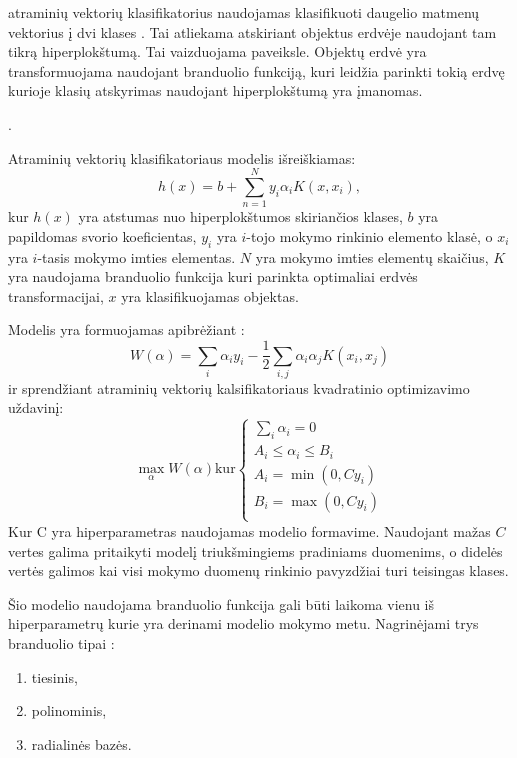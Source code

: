 atraminių vektorių klasifikatorius naudojamas klasifikuoti daugelio matmenų vektorius į dvi klases \cite{comp}. Tai atliekama atskiriant objektus erdvėje naudojant tam tikrą hiperplokštumą. Tai vaizduojama  paveiksle. Objektų erdvė yra transformuojama naudojant branduolio funkciją, kuri leidžia parinkti tokią erdvę kurioje klasių atskyrimas naudojant hiperplokštumą yra įmanomas.

.

Atraminių vektorių klasifikatoriaus modelis išreiškiamas\cite{comp}:
\begin{equation}
    h(x) = b + \sum_{n=1}^{N}y_i \alpha_i K(x, x_i),
\end{equation}
kur $h(x)$ yra atstumas nuo hiperplokštumos skiriančios klases, $b$ yra papildomas svorio koeficientas, $y_i$ yra $i$-tojo mokymo rinkinio elemento klasė, o $x_i$ yra $i$-tasis mokymo imties elementas. $N$ yra mokymo imties elementų skaičius, $K$ yra naudojama branduolio funkcija kuri parinkta optimaliai erdvės transformacijai, $x$ yra klasifikuojamas objektas.

Modelis yra formuojamas apibrėžiant \cite{ksvm}:
\begin{equation}
    W(\alpha) = \sum_{i}\alpha_i y_i - \frac{1}{2} \sum_{i, j} \alpha_i \alpha_j K(x_i, x_j)
\end{equation}
ir sprendžiant atraminių vektorių kalsifikatoriaus kvadratinio optimizavimo uždavinį:
\begin{equation}
\max_{\alpha} W(\alpha) \text{kur} \left\{
                  \begin{array}{l}
                    \sum_{i} \alpha_i = 0 \\
                    A_i \leq \alpha_i \leq B_i \\
                    A_i = \min(0, Cy_i) \\
                    B_i = \max(0, Cy_i) \\
                  \end{array}
                \right.
\end{equation}
Kur C yra hiperparametras naudojamas modelio formavime. Naudojant mažas $C$ vertes galima pritaikyti modelį triukšmingiems pradiniams duomenims, o didelės vertės galimos kai visi mokymo duomenų rinkinio pavyzdžiai turi teisingas klases.

Šio modelio naudojama branduolio funkcija gali būti laikoma vienu iš hiperparametrų kurie yra derinami modelio mokymo metu. Nagrinėjami trys branduolio tipai \cite{vw}:
\begin{enumerate}
    \item tiesinis,
    \item polinominis,
    \item radialinės bazės.
\end{enumerate}

